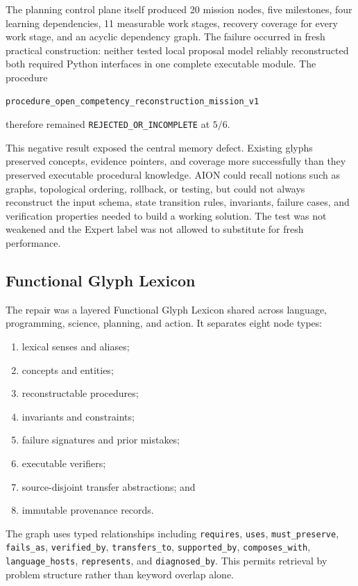 The planning control plane itself produced 20 mission nodes, five milestones,
four learning dependencies, 11 measurable work stages, recovery coverage for
every work stage, and an acyclic dependency graph.  The failure occurred in
fresh practical construction: neither tested local proposal model reliably
reconstructed both required Python interfaces in one complete executable
module.  The procedure
\begin{verbatim}
procedure_open_competency_reconstruction_mission_v1
\end{verbatim}
therefore remained \texttt{REJECTED\_OR\_INCOMPLETE} at $5/6$.

This negative result exposed the central memory defect.  Existing glyphs
preserved concepts, evidence pointers, and coverage more successfully than
they preserved executable procedural knowledge.  AION could recall notions
such as graphs, topological ordering, rollback, or testing, but could not
always reconstruct the input schema, state transition rules, invariants,
failure cases, and verification properties needed to build a working solution.
The test was not weakened and the Expert label was not allowed to substitute
for fresh performance.

\subsection{Functional Glyph Lexicon}

The repair was a layered Functional Glyph Lexicon shared across language,
programming, science, planning, and action.  It separates eight node types:
\begin{enumerate}
    \item lexical senses and aliases;
    \item concepts and entities;
    \item reconstructable procedures;
    \item invariants and constraints;
    \item failure signatures and prior mistakes;
    \item executable verifiers;
    \item source-disjoint transfer abstractions; and
    \item immutable provenance records.
\end{enumerate}

The graph uses typed relationships including
\texttt{requires}, \texttt{uses}, \texttt{must\_preserve},
\texttt{fails\_as}, \texttt{verified\_by}, \texttt{transfers\_to},
\texttt{supported\_by}, \texttt{composes\_with},
\texttt{language\_hosts}, \texttt{represents}, and
\texttt{diagnosed\_by}.  This permits retrieval by problem structure rather
than keyword overlap alone.

